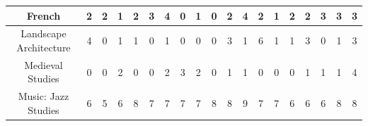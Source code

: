 \documentclass[10]{article}
\begin{document}
\begin{landscape}
\begin{longtable}[c]{|ccccccccccccccccccc|}
	\multicolumn{1}{|c|}{French}                                     & \multicolumn{1}{c|}{2}          & \multicolumn{1}{c|}{2}          & \multicolumn{1}{c|}{1}          & \multicolumn{1}{c|}{2}          & \multicolumn{1}{c|}{3}          & \multicolumn{1}{c|}{4}          & \multicolumn{1}{c|}{0}          & \multicolumn{1}{c|}{1}          & \multicolumn{1}{c|}{0}          & \multicolumn{1}{c|}{2}          & \multicolumn{1}{c|}{4}          & \multicolumn{1}{c|}{2}          & \multicolumn{1}{c|}{1}          & \multicolumn{1}{c|}{2}          & \multicolumn{1}{c|}{2}          & \multicolumn{1}{c|}{3}          & \multicolumn{1}{c|}{3}          & 3          \\ \hline
	\multicolumn{1}{|c|}{Landscape Architecture}                     & \multicolumn{1}{c|}{4}          & \multicolumn{1}{c|}{0}          & \multicolumn{1}{c|}{1}          & \multicolumn{1}{c|}{1}          & \multicolumn{1}{c|}{0}          & \multicolumn{1}{c|}{1}          & \multicolumn{1}{c|}{0}          & \multicolumn{1}{c|}{0}          & \multicolumn{1}{c|}{0}          & \multicolumn{1}{c|}{3}          & \multicolumn{1}{c|}{1}          & \multicolumn{1}{c|}{6}          & \multicolumn{1}{c|}{1}          & \multicolumn{1}{c|}{1}          & \multicolumn{1}{c|}{3}          & \multicolumn{1}{c|}{0}          & \multicolumn{1}{c|}{1}          & 3          \\ \hline
	\multicolumn{1}{|c|}{Medieval Studies}                           & \multicolumn{1}{c|}{0}          & \multicolumn{1}{c|}{0}          & \multicolumn{1}{c|}{2}          & \multicolumn{1}{c|}{0}          & \multicolumn{1}{c|}{0}          & \multicolumn{1}{c|}{2}          & \multicolumn{1}{c|}{3}          & \multicolumn{1}{c|}{2}          & \multicolumn{1}{c|}{0}          & \multicolumn{1}{c|}{1}          & \multicolumn{1}{c|}{1}          & \multicolumn{1}{c|}{0}          & \multicolumn{1}{c|}{0}          & \multicolumn{1}{c|}{0}          & \multicolumn{1}{c|}{1}          & \multicolumn{1}{c|}{1}          & \multicolumn{1}{c|}{1}          & 4          \\ \hline
	\multicolumn{1}{|c|}{Music: Jazz Studies}                        & \multicolumn{1}{c|}{6}          & \multicolumn{1}{c|}{5}          & \multicolumn{1}{c|}{6}          & \multicolumn{1}{c|}{8}          & \multicolumn{1}{c|}{7}          & \multicolumn{1}{c|}{7}          & \multicolumn{1}{c|}{7}          & \multicolumn{1}{c|}{7}          & \multicolumn{1}{c|}{8}          & \multicolumn{1}{c|}{8}          & \multicolumn{1}{c|}{9}          & \multicolumn{1}{c|}{7}          & \multicolumn{1}{c|}{7}          & \multicolumn{1}{c|}{6}          & \multicolumn{1}{c|}{6}          & \multicolumn{1}{c|}{6}          & \multicolumn{1}{c|}{8}          & 8          \\ \hline

\end{longtable}
\end{landscape}
\end{document}
